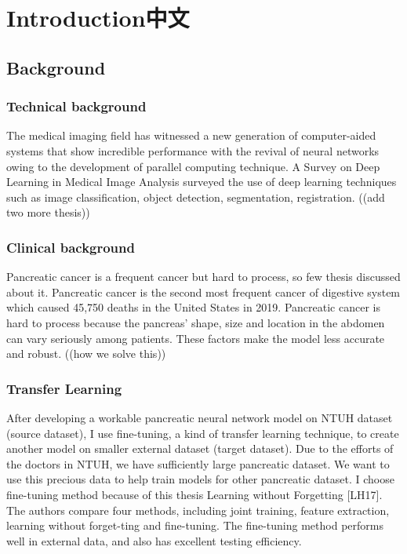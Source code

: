 \chapter{Introduction中文}
\section{Background}
\subsection{Technical background}
The medical imaging field has witnessed a new generation of computer-aided systems that show incredible performance with the revival of neural networks owing to the development of parallel computing technique. A Survey on Deep Learning in Medical Image Analysis \cite{litjens2017survey} surveyed the use of deep learning techniques such as image classification, object detection, segmentation, registration. ((add two more thesis)) 

\subsection{Clinical background}
Pancreatic cancer is a frequent cancer but hard to process, so few thesis discussed about it. Pancreatic cancer is the second most frequent cancer of digestive system which caused 45,750 deaths in the United States in 2019\cite{siegel2019cancer}. Pancreatic cancer is hard to process because the pancreas’ shape, size and location in the abdomen can vary seriously among patients. These factors make the model less accurate and robust. \cite{Roth2015-mi} ((how we solve this))

\subsection{Transfer Learning}
After developing a workable pancreatic neural network model on NTUH dataset (source dataset), I use fine-tuning, a kind of transfer learning technique, to create another model on smaller external dataset (target dataset). Due to the efforts of the doctors in NTUH, we have sufficiently large pancreatic dataset.  We want to use this precious data to help train models for other pancreatic dataset. I choose fine-tuning method because of this thesis Learning without Forgetting [LH17]. The authors compare four methods, including joint training, feature extraction, learning without forget-ting and fine-tuning.  The fine-tuning method performs well in external data, and also has excellent testing efficiency.

